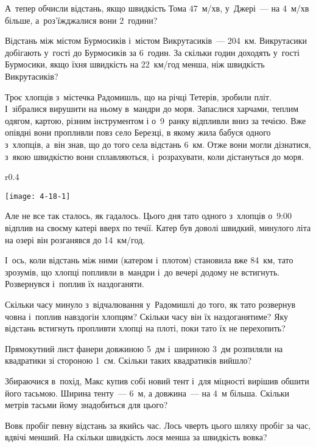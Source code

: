 А~тепер обчисли відстань, якщо швидкість Тома 47~м/хв,
у~Джері~--- на 4~м/хв більше, а~роз’їжджалися вони 2~години?


\problem
Відстань між містом Бурмосиків і~містом Викрутасиків~--- 204~км.
Викрутасики добігають у~гості до Бурмосиків за 6~годин.
За скільки годин доходять у~гості Бурмосики,
якщо їхня швидкість на 22~км/год менша, ніж швидкість Викрутасиків?


\problem
{}
Троє хлопців з~містечка Радомишль, що на річці Тетерів, зробили пліт.
І~зібралися вирушити на ньому в~мандри до моря. Запаслися харчами,
теплим одягом, картою, різним інструментом і о~9~ранку відпливли вниз
за течією. Вже опівдні вони пропливли повз село Березці, в якому жила
бабуся одного з~хлопців, а~він знав, що до того села відстань 6~км.
Отже вони могли дізнатися, з~якою швидкістю вони сплавляються,
і~розрахувати, коли дістануться до моря.

\begin{wrapfigure}{r}{0.4\textwidth}
    \begin{center}
        \texttt{[image: 4-18-1]}
    \end{center}
\end{wrapfigure}

Але не все так сталось, як гадалось. Цього дня тато одного з~хлопців
о~9:00 відплив на своєму катері вверх по течії. Катер був доволі швидкий,
минулого літа на озері він розганявся до 14~км/год.

І~ось, коли відстань між ними (катером і~плотом) становила вже 84~км,
тато зрозумів, що хлопці попливли в~мандри і~до вечері додому не встигнуть.
Розвернувся і~поплив їх наздоганяти.

Скільки часу минуло з~відчалювання у~Радомишлі до того, як тато
розвернув човна і~поплив навздогін хлопцям?
Скільки часу він їх наздоганятиме?
Яку відстань встигнуть пропливти хлопці на плоті, поки тато їх не перехопить?


\problem
Прямокутний лист фанери довжиною 5~дм і~шириною 3~дм розпиляли на квадратики
зі стороною 1~см.
Скільки таких квадратиків вийшло?


\problem
Збираючися в~похід, Макс купив собі новий тент і~для міцності вирішив
обшити його тасьмою. Ширина тенту~--- 6~м, а довжина~--- на 4~м більша.
Скільки метрів тасьми йому знадобиться для цього?


\problem
Вовк пробіг певну відстань за якийсь час.
Лось чверть цього шляху пробіг за час, вдвічі менший.
На скільки швидкість лося менша за швидкість вовка?


